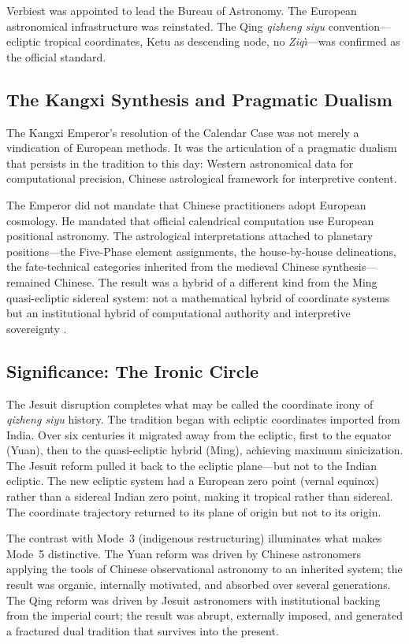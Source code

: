 \documentclass[10pt,a4paper]{article}
\begin{document}
Verbiest was appointed to lead the Bureau of Astronomy.  The
European astronomical infrastructure was reinstated.  The Qing
\textit{qizheng siyu} convention---ecliptic tropical coordinates, Ketu as
descending node, no \textit{Ziq\`{\i}}---was confirmed as the official
standard.

\subsection*{The Kangxi Synthesis and Pragmatic Dualism}

The Kangxi Emperor's resolution of the Calendar Case was not merely
a vindication of European methods.  It was the articulation of a
pragmatic dualism that persists in the tradition to this day: Western
astronomical data for computational precision, Chinese astrological
framework for interpretive content.

The Emperor did not mandate that Chinese practitioners adopt European
cosmology.  He mandated that official calendrical computation use
European positional astronomy.  The astrological interpretations
attached to planetary positions---the Five-Phase element assignments,
the house-by-house delineations, the fate-technical categories
inherited from the medieval Chinese synthesis---remained Chinese.
The result was a hybrid of a different kind from the Ming
quasi-ecliptic sidereal system: not a mathematical hybrid of coordinate systems
but an institutional hybrid of computational authority and
interpretive sovereignty \cite{liu2020missionary,jami2015calendar}.

\subsection*{Significance: The Ironic Circle}

The Jesuit disruption completes what may be called the coordinate
irony of \textit{qizheng siyu} history.  The tradition began with ecliptic
coordinates imported from India.  Over six centuries it migrated
away from the ecliptic, first to the equator (Yuan), then to the
quasi-ecliptic hybrid (Ming), achieving maximum sinicization.  The
Jesuit reform pulled it back to the ecliptic plane---but not to the
Indian ecliptic.  The new ecliptic system had a European zero point
(vernal equinox) rather than a sidereal Indian zero point, making
it tropical rather than sidereal.  The coordinate trajectory
returned to its plane of origin but not to its origin.

The contrast with Mode~3 (indigenous restructuring) illuminates what
makes Mode~5 distinctive.  The Yuan reform was driven by Chinese
astronomers applying the tools of Chinese observational astronomy to
an inherited system; the result was organic, internally motivated,
and absorbed over several generations.  The Qing reform was driven
by Jesuit astronomers with institutional backing from the imperial
court; the result was abrupt, externally imposed, and generated a
fractured dual tradition that survives into the present.
\end{document}
